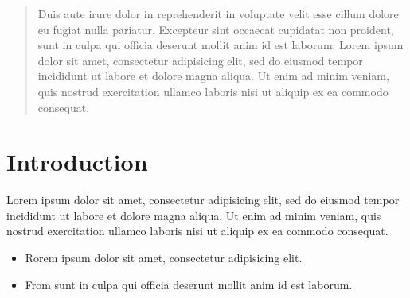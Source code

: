 \documentclass[a0, portrait]{a0poster}
\begin{document}

\begin{multicols}{3} %


\color{Navy} %

\begin{abstract}
Duis aute irure dolor in reprehenderit in voluptate velit esse
cillum dolore eu fugiat nulla pariatur. Excepteur sint occaecat cupidatat non
proident, sunt in culpa qui officia deserunt mollit anim id est laborum. Lorem ipsum dolor sit amet, consectetur adipisicing elit, sed do eiusmod
tempor incididunt ut labore et dolore magna aliqua. Ut enim ad minim veniam,
quis nostrud exercitation ullamco laboris nisi ut aliquip ex ea commodo
consequat.
\end{abstract}

\color{Black} %
\section*{Introduction}
Lorem ipsum dolor sit amet, consectetur adipisicing elit, sed do eiusmod
tempor incididunt ut labore et dolore magna aliqua. Ut enim ad minim veniam,
quis nostrud exercitation ullamco laboris nisi ut aliquip ex ea commodo
consequat.
\begin{itemize}
\item Rorem ipsum dolor sit amet, consectetur adipisicing elit.

\item From sunt in culpa qui officia deserunt mollit anim id est laborum.
\end{itemize}

\color{Black} %


\end{multicols}
\end{document}
